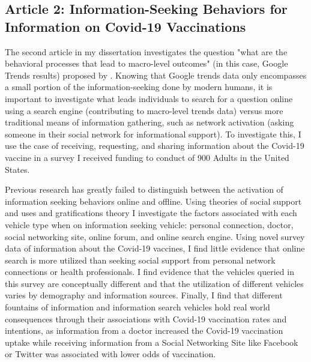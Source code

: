 \subsection{Article 2: Information-Seeking Behaviors for Information on Covid-19 Vaccinations}
The second article in my dissertation investigates the question "what
are the behavioral processes that lead to macro-level outcomes" (in this
case, Google Trends results) proposed by \citet{breigerScaling2015}. Knowing that
Google trends data only encompasses a small portion of the
information-seeking done by modern humans, it is important to
investigate what leads individuals to search for a question online using
a search engine (contributing to macro-level trends data) versus more
traditional means of information gathering, such as network activation
(asking someone in their social network for informational support). To
investigate this, I use the case of receiving, requesting, and sharing
information about the Covid-19 vaccine in a survey I received funding to
conduct of 900 Adults in the United States.

Previous research has greatly failed to distinguish between the activation of
information seeking behaviors online and offline. Using theories of social
support and uses and gratifications theory I investigate the factors associated
with each vehicle type when on information seeking vehicle: personal connection,
doctor, social networking site, online forum, and online search engine. Using
novel survey data of %
information about the Covid-19 vaccines, I find little evidence that online
search is more utilized than seeking social support from personal network
connections or health professionals. I find evidence that the vehicles queried
in this survey are conceptually different and that the utilization of different
vehicles varies by demography and information sources. Finally, I find that
different fountains of information and information search vehicles hold real
world consequences through their associations with Covid-19 vaccination rates
and intentions, as information from a doctor increased the Covid-19 vaccination
uptake while receiving information from a Social Networking Site like Facebook
or Twitter was associated with lower odds of vaccination.  

